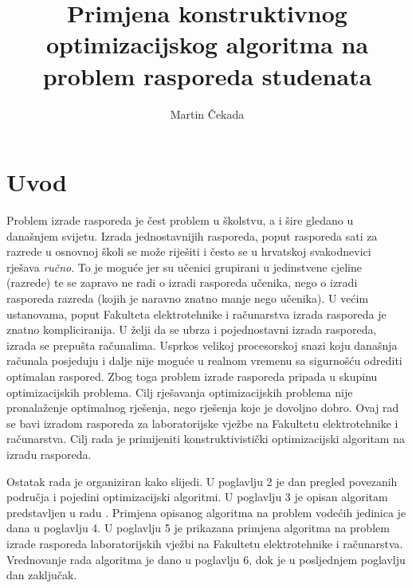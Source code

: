 \documentclass[times, utf8, zavrsni]{fer}
\begin{document}

\title{Primjena konstruktivnog optimizacijskog algoritma na problem
rasporeda studenata}

\author{Martin Čekada}

\maketitle

\izvornik


\tableofcontents

\chapter{Uvod}
Problem izrade rasporeda je čest problem u školstvu, a i šire gledano u današnjem svijetu. Izrada jednostavnijih rasporeda, poput
rasporeda sati za razrede u osnovnoj školi se može riješiti i često se u hrvatskoj svakodnevici rješava \textit{ručno}. To je moguće jer su učenici
grupirani u jedinstvene cjeline (razrede) te se zapravo ne radi o izradi rasporeda učenika, nego o izradi rasporeda razreda (kojih je naravno znatno manje nego učenika).
U većim ustanovama, poput Fakulteta elektrotehnike i računarstva izrada rasporeda je znatno kompliciranija. U želji da se ubrza i pojednostavni izrada rasporeda,
izrada se prepušta računalima. Usprkos velikoj procesorskoj snazi koju današnja računala posjeduju i dalje nije moguće u realnom vremenu sa sigurnošću odrediti
optimalan raspored. Zbog toga problem izrade rasporeda pripada u skupinu optimizacijskih problema. Cilj rješavanja optimizacijskih problema nije pronalaženje optimalnog
rješenja, nego rješenja koje je dovoljno dobro. Ovaj rad se bavi izradom rasporeda za laboratorijske vježbe na Fakultetu elektrotehnike i računarstva. Cilj rada je
primijeniti konstruktivistički optimizacijski algoritam na izradu rasporeda.

Ostatak rada je organiziran kako slijedi. U poglavlju 2 je dan pregled povezanih područja i pojedini optimizacijski algoritmi. U poglavlju 3 je opisan algoritam
predstavljen u radu \cite{DBLP:journals/tec/WuK14}. Primjena opisanog algoritma na problem vodećih jedinica je dana u poglavlju 4. U poglavlju 5 je prikazana primjena
algoritma na problem izrade rasporeda laboratorijskih vježbi na Fakultetu elektrotehnike i računarstva. Vrednovanje rada algoritma je dano u poglavlju 6, dok je
u posljednjem poglavlju dan zaključak.
\end{document}
